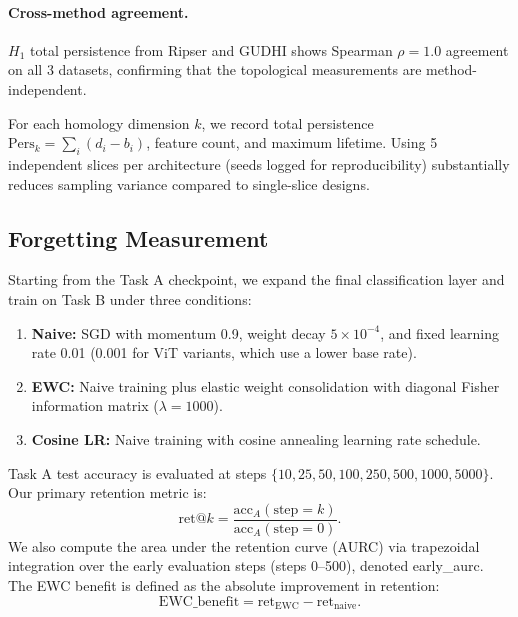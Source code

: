 \documentclass[10pt,twocolumn]{article}
\begin{document}
\paragraph{Cross-method agreement.}
$H_1$ total persistence from Ripser and GUDHI shows Spearman $\rho = 1.0$ agreement on all 3 datasets, confirming that the topological measurements are method-independent.

For each homology dimension $k$, we record total persistence $\text{Pers}_k = \sum_{i} (d_i - b_i)$, feature count, and maximum lifetime. Using 5 independent slices per architecture (seeds logged for reproducibility) substantially reduces sampling variance compared to single-slice designs.

\subsection{Forgetting Measurement}

Starting from the Task A checkpoint, we expand the final classification layer and train on Task B under three conditions:

\begin{enumerate}
    \item \textbf{Naive:} SGD with momentum 0.9, weight decay $5 \times 10^{-4}$, and fixed learning rate 0.01 (0.001 for ViT variants, which use a lower base rate).
    \item \textbf{EWC:} Naive training plus elastic weight consolidation \citep{kirkpatrick2017overcoming} with diagonal Fisher information matrix ($\lambda = 1000$).
    \item \textbf{Cosine LR:} Naive training with cosine annealing learning rate schedule.
\end{enumerate}

Task A test accuracy is evaluated at steps $\{10, 25, 50, 100, 250, 500, 1000, 5000\}$. Our primary retention metric is:
\begin{equation}
    \text{ret}@k = \frac{\text{acc}_A(\text{step} = k)}{\text{acc}_A(\text{step} = 0)}.
    \label{eq:retention}
\end{equation}
We also compute the area under the retention curve (AURC) via trapezoidal integration over the early evaluation steps (steps 0--500), denoted early\_aurc. The EWC benefit is defined as the absolute improvement in retention:
\begin{equation}
    \text{EWC\_benefit} = \text{ret}_{\text{EWC}} - \text{ret}_{\text{naive}}.
    \label{eq:ewc_benefit}
\end{equation}
\end{document}
